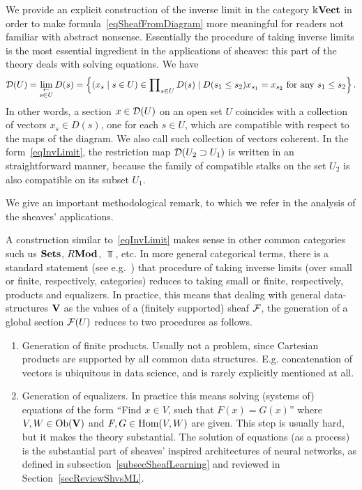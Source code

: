 \begin{rem}\label{remConcreteLimSets}
We provide an explicit construction of the inverse limit in the category $\Bbbk\mathbf{Vect}$ in order to make formula~\eqref{eqSheafFromDiagram} more meaningful for readers not familiar with abstract nonsense. Essentially the procedure of taking inverse limits is the most essential ingredient in the applications of sheaves: this part of the theory deals with solving equations. We have
\begin{equation}\label{eqInvLimit}
\mathcal{D}(U)=\lim\limits_{\substack{\leftarrow \\ s\in U}}D(s)=\left\{(x_s\mid s\in U)\in\prod\nolimits_{s\in U}D(s)\mid D(s_1\leq s_2)x_{s_1}=x_{s_2} \text{ for any }s_1\leq s_2 \right\}.
\end{equation}
In other words, a section $x\in \mathcal{D}(U)$ on an open set $U$ coincides with a collection of vectors $x_s\in D(s)$, one for each $s\in U$, which are compatible with respect to the maps of the diagram. We also call such collection of vectors coherent. In the form~\eqref{eqInvLimit}, the restriction map $\mathcal{D}(U_2\supset U_1)$ is written in an straightforward manner, because the family of compatible stalks on the set $U_2$ is also compatible on its subset $U_1$.
\end{rem}

We give an important methodological remark, to which we refer in the analysis of the sheaves' applications.

\begin{rem}\label{remLimsToProductsEqualizers}
A construction similar to~\eqref{eqInvLimit} makes sense in other common categories such us $\mathbf{Sets}$, $R\mathbf{Mod}$, $\Top$, etc. In more general categorical terms, there is a standard statement (see e.g.~\cite[\S V.2]{MacLane}) that procedure of taking inverse limits (over small or finite, respectively, categories) reduces to taking small or finite, respectively, products and equalizers. In practice, this means that dealing with general data-structures $\mathbf{V}$ as the values of a (finitely supported) sheaf $\mathcal{F}$, the generation of a global section $\mathcal{F}(U)$ reduces to two procedures as follows.
\begin{enumerate}
  \item Generation of finite products. Usually not a problem, since Cartesian products are supported by all common data structures. E.g. concatenation of vectors is ubiquitous in data science, and is rarely explicitly mentioned at all.
  \item Generation of equalizers. In practice this means solving (systems of) equations of the form ``Find $x\in V$, such that $F(x)=G(x)$'' where $V,W\in \operatorname{Ob}(\mathbf{V})$ and $F,G\in \operatorname{Hom}(V, W)$ are given. This step is usually hard, but it makes the theory substantial. The solution of equations (as a process) is the substantial part of sheaves' inspired architectures of neural networks, as defined in subsection~\ref{subsecSheafLearning} and reviewed in Section~\ref{secReviewShvsML}.  
\end{enumerate}
\end{rem}

